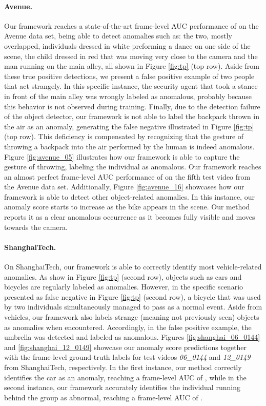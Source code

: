 \documentclass[final]{cvpr}
\begin{document}
\paragraph{Avenue.} Our framework reaches a state-of-the-art frame-level AUC performance of  on the Avenue data set, being able to detect anomalies such as:  the two, mostly overlapped, individuals dressed in white preforming a dance on one side of the scene,  the child dressed in red that was moving very close to the camera and  the man running on the main alley, all shown in Figure \ref{fig:tp} (top row). Aside from these true positive detections, we present a false positive example of two people that act strangely. In this specific instance, the security agent that took a stance in front of the main alley was wrongly labeled as anomalous, probably because this behavior is not observed during training. Finally, due to the detection failure of the object detector, our framework is not able to label the backpack thrown in the air as an anomaly, generating the false negative illustrated in Figure \ref{fig:tp} (top row). This deficiency is compensated by recognizing that the gesture of throwing a backpack into the air performed by the human is indeed anomalous. Figure \ref{fig:avenue_05} illustrates how our framework is able to capture the gesture of throwing, labeling the individual as anomalous. Our framework reaches an almost perfect frame-level AUC performance of  on the fifth test video from the Avenue data set. Additionally, Figure \ref{fig:avenue_16} showcases how our framework is able to detect other object-related anomalies. In this instance, our anomaly score starts to increase as the bike appears in the scene. Our method reports it as a clear anomalous occurrence as it becomes fully visible and moves towards the camera.

\paragraph{ShanghaiTech.} On ShanghaiTech, our framework is able to correctly identify most vehicle-related anomalies. As show in Figure \ref{fig:tp} (second row), objects such as cars and bicycles are regularly labeled as anomalies. However, in the specific scenario presented as false negative in Figure \ref{fig:tp} (second row), a bicycle that was used by two individuals simultaneously managed to pass as a normal event. Aside from vehicles, our framework also labels strange (meaning not previously seen) objects as anomalies when encountered. Accordingly, in the false positive example, the umbrella was detected and labeled as anomalous. Figures \ref{fig:shanghai_06_0144} and \ref{fig:shanghai_12_0149} showcase our anomaly score predictions together with the frame-level ground-truth labels for test videos \textit{06\_0144} and \textit{12\_0149} from ShanghaiTech, respectively. In the first instance, our method correctly identifies the car as an anomaly, reaching a frame-level AUC of , while in the second instance, our framework accurately identifies the individual running behind the group as abnormal, reaching a frame-level AUC of . 
\end{document}
